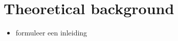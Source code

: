 \chapter{Theoretical background} \label{theoreticalbackground} 

\begin{itemize}
    \item formuleer een inleiding
\end{itemize}




